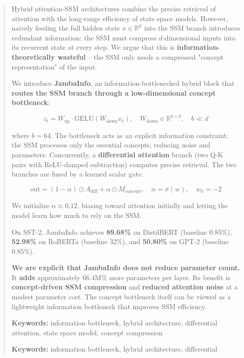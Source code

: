 \documentclass[10pt,twocolumn,letterpaper]{article}
\begin{document}
\maketitle

\begin{abstract}
Hybrid attention-SSM architectures combine the precise retrieval of attention 
with the long-range efficiency of state space models. However, naively 
feeding the full hidden state $x \in \mathbb{R}^d$ into the SSM branch 
introduces redundant information: the SSM must compress $d$-dimensional 
inputs into its recurrent state at every step. We argue that this is 
\textbf{information-theoretically wasteful} -- the SSM only needs a compressed 
"concept representation" of the input.

We introduce \textbf{JambaInfo}, an information-bottlenecked hybrid block that 
\textbf{routes the SSM branch through a low-dimensional concept bottleneck}:

\[
z_t = W_\text{up} \cdot \text{GELU}(W_\text{down} x_t), 
\quad W_\text{down} \in \mathbb{R}^{b \times d}, \quad b \ll d
\]

where $b = 64$. The bottleneck acts as an explicit 
information constraint: the SSM processes only the essential concepts, 
reducing noise and parameters. Concurrently, a \textbf{differential attention} 
branch (two Q-K pairs with ReLU-damped subtraction) computes precise 
retrieval. The two branches are fused by a learned scalar gate:

\[
\text{out} = (1 - \alpha) \odot A_\text{diff} + \alpha \odot M_\text{concept},
\quad \alpha = \sigma(w), \quad w_0 = -2
\]

We initialize $\alpha \approx 0.12$, biasing toward attention initially 
and letting the model learn how much to rely on the SSM.

On SST-2, JambaInfo achieves \textbf{89.68\%} on DistilBERT (baseline 
0.85\%), \textbf{52.98\%} on RoBERTa (baseline 32\%), and 
\textbf{50.80\%} on GPT-2 (baseline 0.85\%).

\textbf{We are explicit that JambaInfo does not reduce parameter count.} It 
\textbf{adds} approximately 66.4M\% more parameters per layer. Its 
benefit is \textbf{concept-driven SSM compression} and \textbf{reduced attention noise} 
at a modest parameter cost. The concept bottleneck itself can be viewed as 
a lightweight information bottleneck that improves SSM efficiency.

\textbf{Keywords:} information bottleneck, hybrid architecture, differential 
attention, state space model, concept compression



\vspace{0.5em}
\noindent\textbf{Keywords:} information bottleneck, hybrid architecture, differential
\end{abstract}
\end{document}
